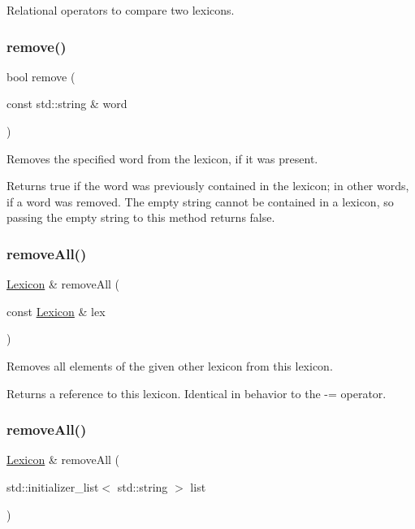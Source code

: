 Relational operators to compare two lexicons. 

\mbox{\label{classLexicon_affc6169b054fb3bbc4d72694e1a5834e}} 
\subsubsection{\texorpdfstring{remove()}{remove()}}
{\footnotesize\ttfamily bool remove (\begin{DoxyParamCaption}\item[{const std\+::string \&}]{word }\end{DoxyParamCaption})}



Removes the specified word from the lexicon, if it was present. 

Returns true if the word was previously contained in the lexicon; in other words, if a word was removed. The empty string cannot be contained in a lexicon, so passing the empty string to this method returns false. \mbox{\label{classLexicon_a606a7338945745d8ac9ce21f456f08d9}} 
\subsubsection{\texorpdfstring{remove\+All()}{removeAll()}\hspace{0.1cm}{\footnotesize\ttfamily [1/2]}}
{\footnotesize\ttfamily \mbox{\hyperlink{classLexicon}{Lexicon}} \& remove\+All (\begin{DoxyParamCaption}\item[{const \mbox{\hyperlink{classLexicon}{Lexicon}} \&}]{lex }\end{DoxyParamCaption})}



Removes all elements of the given other lexicon from this lexicon. 

Returns a reference to this lexicon. Identical in behavior to the -\/= operator. \mbox{\label{classLexicon_a8ef0b8a849b2d33d83bc9689c4c4d090}} 
\subsubsection{\texorpdfstring{remove\+All()}{removeAll()}\hspace{0.1cm}{\footnotesize\ttfamily [2/2]}}
{\footnotesize\ttfamily \mbox{\hyperlink{classLexicon}{Lexicon}} \& remove\+All (\begin{DoxyParamCaption}\item[{std\+::initializer\+\_\+list$<$ std\+::string $>$}]{list }\end{DoxyParamCaption})}



